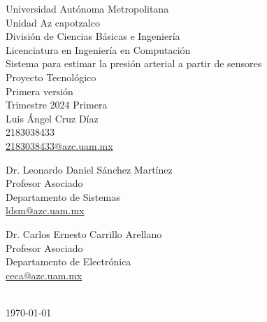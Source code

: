\begin{titlepage}
    \vspace*{\fill}
    \center
    
    \Large Universidad Autónoma Metropolitana\\
    \large {Unidad Az capotzalco}\\
    \normalsize
    División de Ciencias Básicas e Ingeniería\\
    Licenciatura en Ingeniería en Computación\\[2cm]
    
    {\large Sistema para estimar la presión arterial a partir de sensores}\\

    Proyecto Tecnológico\\[0.2cm]
    
    Primera versión\\[0.2cm]
    
    Trimestre 2024 Primera \\[2cm]
    
    Luis Ángel Cruz Díaz\\
    2183038433\\
    \href{mailto:2183038433@azc.uam.mx}{2183038433@azc.uam.mx}\\[2cm]
    
    \begin{minipage}{0.4\textwidth}
        \centering
        Dr. Leonardo Daniel Sánchez Martínez \\
        Profesor Asociado\\
        Departamento de Sistemas\\
        \href{mailto:ldsm@azc.uam.mx}{ldsm@azc.uam.mx}
    \end{minipage}
    \begin{minipage}{0.4\textwidth}
        \centering
        Dr. Carlos Ernesto Carrillo Arellano\\
        Profesor Asociado\\
        Departamento de Electrónica\\
        \href{mailto:ceca@azc.uam.mx}{ceca@azc.uam.mx}%
    \end{minipage}\\[1cm]
    
    \textspanish{\today}
    
    \vfill
    \vspace*{\fill}
\end{titlepage}